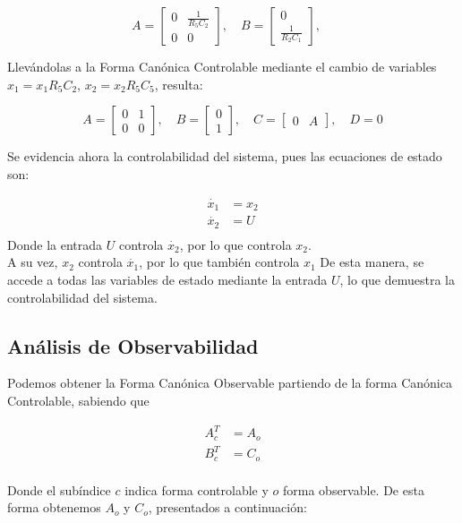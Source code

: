 \documentclass[letterpaper, 10 pt, conference]{ieeeconf}  %
\begin{document}
\[ 
A = \begin{bmatrix}
0 & \frac{1}{R_5C_2} \\
0 & 0
\end{bmatrix}, \quad
B = \begin{bmatrix}
0 \\
\frac{1}{R_2C_1}
\end{bmatrix}, \quad 
\] 

Llevándolas a la Forma Canónica Controlable mediante el cambio de variables $x_1 = x_1R_5C_2$, $x_2 =x_2R_5C_5$, resulta:

\[ 
A = \begin{bmatrix}
0 & 1\\
0 & 0
\end{bmatrix}, \quad
B = \begin{bmatrix}
0 \\
1
\end{bmatrix}, \quad 
C = \begin{bmatrix}
0 & A
\end{bmatrix}, \quad
D = 0
\] 

Se evidencia ahora la controlabilidad del sistema, pues las ecuaciones de estado son:

\[
\begin{aligned}
\dot{x_1} &=  x_2 \\
\dot{x_2}&= U \\
\end{aligned}
\]
Donde la entrada $U$ controla $\dot{x_2}$, por lo que controla $x_2$. \\
A su vez, $x_2$ controla $\dot{x_1}$, por lo que también controla $x_1$
De esta manera, se accede a todas las variables de estado mediante la entrada $U$, lo que demuestra la controlabilidad del sistema.

\subsection{Análisis de Observabilidad}

Podemos obtener la Forma Canónica Observable partiendo de la forma Canónica Controlable, sabiendo que

\[
\begin{aligned}
A_{c}^{T} &=  A_{o} \\
B_{c}^{T} &=  C_{o} \\
\end{aligned}
\]

Donde el subíndice $c$ indica forma controlable y $o$ forma observable.
De esta forma obtenemos $A_{o}$ y $C_{o}$, presentados a continuación:
\end{document}

